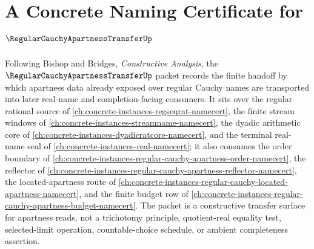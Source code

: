 \chapter{A Concrete Naming Certificate for $\RegularCauchyApartnessTransferUp$}
\label{ch:concrete-instances-regular-cauchy-apartness-transfer-namecert}

Following Bishop and Bridges, \emph{Constructive Analysis}, the $\RegularCauchyApartnessTransferUp$ packet records the finite handoff by which apartness data already exposed over regular Cauchy names are transported into later real-name and completion-facing consumers. It sits over the regular rational source of \autoref{ch:concrete-instances-regseqrat-namecert}, the finite stream windows of \autoref{ch:concrete-instances-streamname-namecert}, the dyadic arithmetic core of \autoref{ch:concrete-instances-dyadicratcore-namecert}, and the terminal real-name seal of \autoref{ch:concrete-instances-real-namecert}; it also consumes the order boundary of \autoref{ch:concrete-instances-regular-cauchy-apartness-order-namecert}, the reflector of \autoref{ch:concrete-instances-regular-cauchy-apartness-reflector-namecert}, the located-apartness route of \autoref{ch:concrete-instances-regular-cauchy-located-apartness-namecert}, and the finite budget row of \autoref{ch:concrete-instances-regular-cauchy-apartness-budget-namecert}. The packet is a constructive transfer surface for apartness reads, not a trichotomy principle, quotient-real equality test, selected-limit operation, countable-choice schedule, or ambient completeness assertion.

